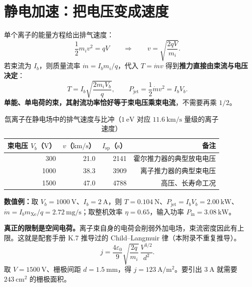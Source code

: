 \section{静电加速：把电压变成速度}

单个离子的能量方程给出排气速度：
\begin{equation}
\frac12m_iv^2=qV
\qquad\Longrightarrow\qquad
v=\sqrt{\frac{2qV}{m_i}} .
\label{eq:app-o-vbeam}
\end{equation}
若束流为 $I_b$，则质量流率 $\dot m=I_bm_i/q$，代入 $T=\dot mv$ 得到\textbf{推力直接由束流与电压决定}：
\begin{equation}
T=I_b\sqrt{\frac{2m_iV_b}{q}},
\qquad
P_{\mathrm{jet}}=\frac12\dot mv^2=I_bV_b .
\label{eq:app-o-ibeam}
\end{equation}
\textbf{单能、单电荷的束，其射流功率恰好等于束电压乘束电流}，不需要再乘 $1/2$。

\begin{table}[htbp]
\centering
\small
\caption{氙离子在静电场中的排气速度与比冲（$1\ \mathrm{eV}$ 对应 $11.6\ \mathrm{km/s}$ 量级的离子速度）}
\label{tab:app-o-beam}
\begin{tabular}{@{}rrrr@{}}
\toprule
束电压 $V_b$（$\mathrm{V}$） & $v$（$\mathrm{km/s}$） & $I_{\mathrm{sp}}$（$\mathrm{s}$） & 备注 \\
\midrule
300 & 21.0 & 2141 & 霍尔推力器的典型放电电压 \\
1000 & 38.3 & 3909 & 离子推力器的典型束电压 \\
1500 & 47.0 & 4788 & 高压、长寿命工况 \\
\bottomrule
\end{tabular}
\end{table}

\textbf{数值例：}取 $V_b=1000\ \mathrm{V}$、$I_b=2\ \mathrm{A}$，则 $T=0.104\ \mathrm{N}$、$P_{\mathrm{jet}}=I_bV_b=2.00\ \mathrm{kW}$、$\dot m=I_bm_{\mathrm{Xe}}/q=2.72\ \mathrm{mg/s}$；取整机效率 $\eta=0.65$，输入功率 $P_{\mathrm{in}}=3.08\ \mathrm{kW}$。

\textbf{真正的限制是空间电荷。}离子束自身的电荷会削弱外加电场，束流密度因此有上限。这就是配套手册 K.7 推导过的 Child--Langmuir 律（本附录不重复推导）。
\begin{equation}
j=\frac{4\varepsilon_0}{9}\sqrt{\frac{2q}{m_i}}\,\frac{V^{3/2}}{d^2}.
\label{eq:app-o-cl}
\end{equation}
取 $V=1500\ \mathrm{V}$、栅极间距 $d=1.5\ \mathrm{mm}$，得 $j=123\ \mathrm{A/m^2}$。要引出 $3\ \mathrm{A}$ 就需要 $243\ \mathrm{cm^2}$ 的栅极面积。

